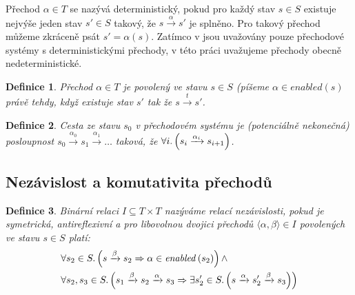 \documentclass[12pt]{fithesis2}
\newtheorem{definition}{Definice}
\newcommand{\tuple}[1]{\langle #1 \rangle}
\begin{document}
Přechod $\alpha \in T$ se nazývá deterministický, pokud pro každý stav $s \in S$ existuje nejvýše jeden stav $s' \in S$ takový, že $s \xrightarrow{\alpha} s'$ je splněno. Pro takový přechod můžeme zkráceně psát $s' = \alpha(s)$. Zatímco v \cite{CLARKE} jsou uvažovány pouze přechodové systémy s deterministickými přechody, v této práci uvažujeme přechody obecně nedeterministické.


\begin{definition}
Přechod $\alpha \in T$ je povolený ve stavu $s \in S$ (píšeme $\alpha \in \mathit{enabled}(s)$ právě tehdy, když existuje stav $s'$ tak že $s \xrightarrow{t} s'$.
\end{definition}

\begin{definition}
Cesta ze stavu $s_0$ v přechodovém systému je (potenciálně nekonečná) posloupnost $s_0 \xrightarrow{\alpha_0} s_1 \xrightarrow{\alpha_1} \ldots $ taková, že $\forall i \ldotp \left({ s_i \xrightarrow{\alpha_i} s_{i+1} }\right)$.
\end{definition}

\subsection{Nezávislost a komutativita přechodů}

\begin{definition}
Binární relaci $I \subseteq T \times T$ nazýváme relací nezávislosti, pokud je symetrická, antireflexivní a pro libovolnou dvojici přechodů $\tuple{\alpha, \beta} \in I$ povolených ve stavu $s \in S$ platí:
\begin{equation}\label{eq:independent-my}
\begin{split}
&\forall s_2 \in S \ldotp
\left({
	s \xrightarrow{\beta} s_2
	\Rightarrow
	\alpha \in \mathit{enabled}\left({s_2}\right)
}\right)
\land \\
&\forall s_2, s_3 \in S \ldotp \left({
	s_1 \xrightarrow{\beta} s_2 \xrightarrow{\alpha} s_3
	\Rightarrow
	\exists s_2' \in S \ldotp \left({
		s \xrightarrow{\alpha} s_2' \xrightarrow{\beta} s_3
	}\right)
}\right)
\end{split}
\end{equation}

\end{definition}
\end{document}
